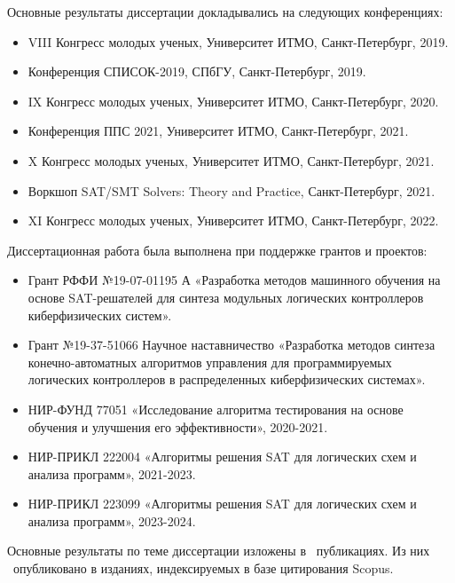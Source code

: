 \probation
%
Основные результаты диссертации докладывались на следующих конференциях:
\begin{itemize}[beginpenalty=10000]
    \item VIII Конгресс молодых ученых, Университет ИТМО, Санкт-Петербург, 2019.
    \item Конференция СПИСОК-2019, СПбГУ, Санкт-Петербург, 2019.
    \item IX Конгресс молодых ученых, Университет ИТМО, Санкт-Петербург, 2020.
    \item Конференция ППС 2021, Университет ИТМО, Санкт-Петербург, 2021.
    \item X Конгресс молодых ученых, Университет ИТМО, Санкт-Петербург, 2021.
    \item Воркшоп SAT/SMT Solvers: Theory and Practice, Санкт-Петербург, 2021.
    \item XI Конгресс молодых ученых, Университет ИТМО, Санкт-Петербург, 2022.
\end{itemize}

Диссертационная работа была выполнена при поддержке грантов и проектов:
\begin{itemize}[beginpenalty=10000]
    \item Грант РФФИ №19-07-01195 А «Разработка методов машинного
    обучения на основе SAT-решателей для синтеза модульных логических контроллеров киберфизических систем».
    \item Грант №19-37-51066 Научное наставничество «Разработка методов синтеза конечно-автоматных алгоритмов управления для программируемых логических контроллеров в распределенных киберфизических системах».
    \item НИР-ФУНД 77051 «Исследование алгоритма тестирования на основе обучения и улучшения его эффективности», 2020-2021.
    \item НИР-ПРИКЛ 222004 «Алгоритмы решения SAT для логических схем и анализа программ», 2021-2023.
    \item НИР-ПРИКЛ 223099 «Алгоритмы решения SAT для логических схем и анализа программ», 2023-2024.
\end{itemize}



\publications
%
Основные результаты по теме диссертации изложены в \theAllMyPapers~публикациях.
Из них
\theScopusPapers~опубликовано в изданиях, индексируемых в базе цитирования Scopus.

